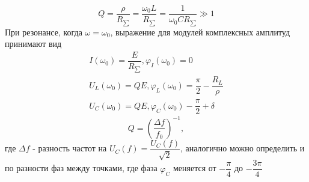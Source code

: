 \documentclass[a4paper, 12pt]{article}%
\begin{document}
\begin{equation}
Q = \dfrac{\rho}{R_{\sum}} = \dfrac{\omega_0 L}{R_{\sum}} = \dfrac{1}{\omega_0CR_{\sum}} \gg 1
\end{equation}
При резонансе, когда $\omega = \omega_0$, выражение для модулей комплексных амплитуд принимают вид
\begin{equation}
\begin{gathered}
I(\omega_0) = \dfrac{E}{R_{\sum}}, \varphi_I(\omega_0) = 0\\
U_L(\omega_0) = QE, \varphi_L(\omega_0) = \dfrac{\pi}{2} - \dfrac{R_L}{\rho}\\
U_C(\omega_0) = QE, \varphi_C(\omega_0) - \dfrac{\pi}{2} + \delta
\end{gathered}
\end{equation}
\begin{equation}
Q = \left(\dfrac{\Delta f}{f_0}\right)^{-1},
\end{equation}
где $\Delta f$ - разность частот на $U_C(f) = \dfrac{U_C(f)}{\sqrt{2}}$, аналогично можно определить и по разности фаз между точками, где фаза $\varphi_C$ меняется от $-\dfrac{\pi}{4}$ до $-\dfrac{3\pi}{4}$
\newpage
\end{document}
